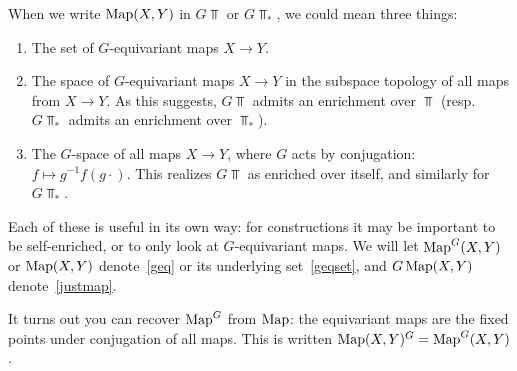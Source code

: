 When we write $\operatorname{Map}(X, Y)$ in $G\Top$ or $G\Top_*$, we could mean three things:
\begin{enumerate}
	\item\label{geqset} The set of $G$-equivariant maps $X\to Y$.
	\item\label{geq} The space of $G$-equivariant maps $X\to Y$ in the subspace topology of all maps from $X\to Y$.
	As this suggests, $G\Top$ admits an enrichment over $\Top$ (resp.\ $G\Top_*$ admits an enrichment over
	$\Top_*$).
	\item\label{justmap} The $G$-space of all maps $X\to Y$, where $G$ acts by conjugation: $f\mapsto
	g^{-1}f(g\cdot)$. This realizes $G\Top$ as enriched over itself, and similarly for $G\Top_*$.
\end{enumerate}
Each of these is useful in its own way: for constructions it may be important to be self-enriched, or to only look
at $G$-equivariant maps. We will let $\operatorname{Map}^G(X,Y)$ or $\operatorname{Map}(X,Y)$ denote~\eqref{geq} or its underlying
set~\eqref{geqset}, and $G\operatorname{Map}(X,Y)$ denote~\eqref{justmap}.

It turns out you can recover $\operatorname{Map}^G$ from $\operatorname{Map}$: the equivariant maps are the fixed points under conjugation of
all maps. This is written $\operatorname{Map}(X,Y)^G = \operatorname{Map}^G(X,Y)$.

